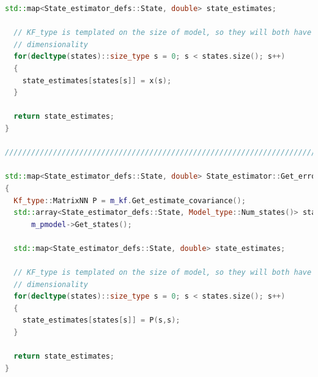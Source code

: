 \documentclass[applsci,article,submit,pdftex,moreauthors]{Definitions/mdpi}
\begin{document}
\begin{lstlisting}[language=c++]
  std::map<State_estimator_defs::State, double> state_estimates;

  // KF_type is templated on the size of model, so they will both have the same
  // dimensionality
  for(decltype(states)::size_type s = 0; s < states.size(); s++)
  {
    state_estimates[states[s]] = x(s);
  }

  return state_estimates;
}

///////////////////////////////////////////////////////////////////////

std::map<State_estimator_defs::State, double> State_estimator::Get_error_variances() const
{
  Kf_type::MatrixNN P = m_kf.Get_estimate_covariance();
  std::array<State_estimator_defs::State, Model_type::Num_states()> states =
      m_pmodel->Get_states();

  std::map<State_estimator_defs::State, double> state_estimates;

  // KF_type is templated on the size of model, so they will both have the same
  // dimensionality
  for(decltype(states)::size_type s = 0; s < states.size(); s++)
  {
    state_estimates[states[s]] = P(s,s);
  }

  return state_estimates;
}

\end{lstlisting}
\end{document}
